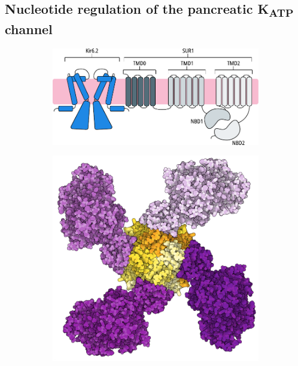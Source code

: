 \subsection{Nucleotide regulation of the pancreatic K\textsubscript{ATP} channel}

\begin{figure}[h]
	\centering
	\begin{subfigure}[t]{0.9\textwidth}
		\caption{}\label{ch1fig:katp_cartoon}
		\centering
		\includegraphics[width=\textwidth]{katp_cartoon.pdf}
	\end{subfigure}
	\vfill
	\begin{subfigure}[t]{0.45\textwidth}
		\caption{}\label{ch1fig:sur_topdown}
		\centering
		\includegraphics[width=\textwidth]{sur_topdown_propellor.pdf}

\end{subfigure}
\end{figure}
